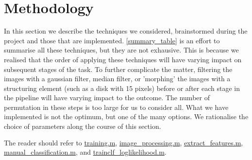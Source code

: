 \documentclass[main.tex]{subfiles}
\begin{document}
\section{Methodology} \label{methodology}

In this section we describe the techniques we considered, brainstormed during the project and those that are implemented. \autoref{summary_table} is an effort to summarise all these techniques, but they are not exhausive. This is because we realised that the order of applying these techniques will have varying impact on subsequent stages of the task. To further complicate the matter, filtering the images with a gaussian filter, median filter, or 'morphing' the images with a structuring element (such as a disk with 15 pixels) before or after each stage in the pipeline will have varying impact to the outcome. The number of permutation in these steps is too large for us to consider all. What we have implemented is not the optimum, but one of the many options. We rationalise the choice of parameters along the course of this section.

The reader should refer to \hyperlink{training}{training.m}, \hyperlink{imageprocessing}{image\_processing.m}, \hyperlink{extractfeat}{extract\_features.m}, \hyperlink{manclf}{manual\_classification.m}, and  \hyperlink{trainclf}{trainclf\_loglikelihood.m}.
\end{document}
